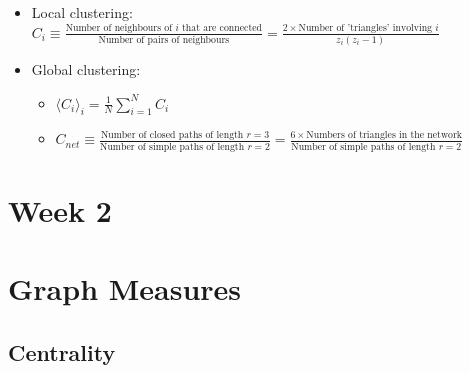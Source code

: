 \documentclass[12pt]{article}
\theoremstyle{definition}
\begin{document}
\begin{itemize}
\begin{itemize}
        \item Local clustering: $C_i\equiv \frac{\text{Number of neighbours of $i$ that are connected}}{\text{Number of pairs of neighbours}}=\frac{2\times\text{Number of 'triangles' involving $i$}}{z_i(z_i-1)}$
        \item Global clustering: 
        \begin{itemize}
            \item $\langle C_i\rangle_i=\frac{1}{N}\sum_{i=1}^NC_i$
            \item $C_{net}\equiv \frac{\text{Number of closed paths of length $r=3$}}{\text{Number of simple paths of length $r=2$}} = \frac{6\times\text{Numbers of triangles in the network}}{\text{Number of simple paths of length $r=2$}}$
        \end{itemize}
    \end{itemize}
\end{itemize}

\newpage


\section*{Week 2}

\section{Graph Measures}

\subsection{Centrality}
\end{document}
